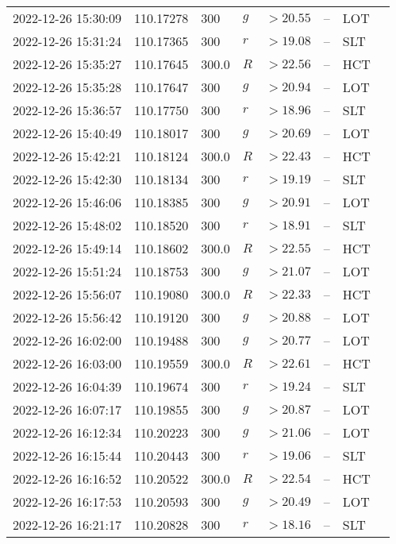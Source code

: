 \documentclass{nature_plusfigure}
\begin{document}
\begin{supplement}
\begin{center}
\begin{longtable}{llllllll}
2022-12-26 15:30:09 & 110.17278 & 300 & $g$ & $>20.55$ & -- & LOT &  \\ 
2022-12-26 15:31:24 & 110.17365 & 300 & $r$ & $>19.08$ & -- & SLT &  \\ 
2022-12-26 15:35:27 & 110.17645 & 300.0 & $R$ & $>22.56$ & -- & HCT &  \\ 
2022-12-26 15:35:28 & 110.17647 & 300 & $g$ & $>20.94$ & -- & LOT &  \\ 
2022-12-26 15:36:57 & 110.17750 & 300 & $r$ & $>18.96$ & -- & SLT &  \\ 
2022-12-26 15:40:49 & 110.18017 & 300 & $g$ & $>20.69$ & -- & LOT &  \\ 
2022-12-26 15:42:21 & 110.18124 & 300.0 & $R$ & $>22.43$ & -- & HCT &  \\ 
2022-12-26 15:42:30 & 110.18134 & 300 & $r$ & $>19.19$ & -- & SLT &  \\ 
2022-12-26 15:46:06 & 110.18385 & 300 & $g$ & $>20.91$ & -- & LOT &  \\ 
2022-12-26 15:48:02 & 110.18520 & 300 & $r$ & $>18.91$ & -- & SLT &  \\ 
2022-12-26 15:49:14 & 110.18602 & 300.0 & $R$ & $>22.55$ & -- & HCT &  \\ 
2022-12-26 15:51:24 & 110.18753 & 300 & $g$ & $>21.07$ & -- & LOT &  \\ 
2022-12-26 15:56:07 & 110.19080 & 300.0 & $R$ & $>22.33$ & -- & HCT &  \\ 
2022-12-26 15:56:42 & 110.19120 & 300 & $g$ & $>20.88$ & -- & LOT &  \\ 
2022-12-26 16:02:00 & 110.19488 & 300 & $g$ & $>20.77$ & -- & LOT &  \\ 
2022-12-26 16:03:00 & 110.19559 & 300.0 & $R$ & $>22.61$ & -- & HCT &  \\ 
2022-12-26 16:04:39 & 110.19674 & 300 & $r$ & $>19.24$ & -- & SLT &  \\ 
2022-12-26 16:07:17 & 110.19855 & 300 & $g$ & $>20.87$ & -- & LOT &  \\ 
2022-12-26 16:12:34 & 110.20223 & 300 & $g$ & $>21.06$ & -- & LOT &  \\ 
2022-12-26 16:15:44 & 110.20443 & 300 & $r$ & $>19.06$ & -- & SLT &  \\ 
2022-12-26 16:16:52 & 110.20522 & 300.0 & $R$ & $>22.54$ & -- & HCT &  \\ 
2022-12-26 16:17:53 & 110.20593 & 300 & $g$ & $>20.49$ & -- & LOT &  \\ 
2022-12-26 16:21:17 & 110.20828 & 300 & $r$ & $>18.16$ & -- & SLT &  \\ 

\end{longtable}
\end{center}
\end{supplement}
\end{document}
